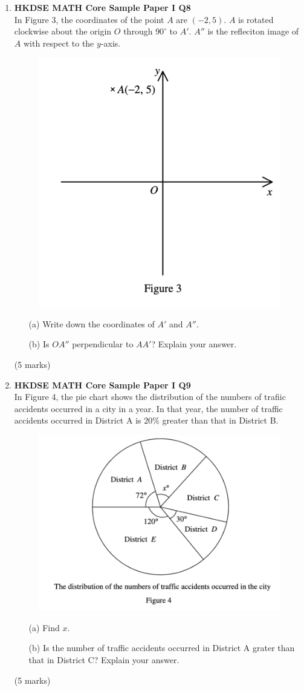 \documentclass[12pt]{article}
\begin{document}
\begin{enumerate}
	\item \textbf{HKDSE MATH Core Sample Paper I Q8}\\
	In Figure 3, the coordinates of the point $A$ are $(-2, 5)$. $A$ is rotated clockwise about the origin $O$ through $90^\circ$ to $A'$. $A''$ is the refleciton image of $A$ with respect to the $y$-axis.
	\begin{figure}[H]
		\centering
		\includegraphics[width = .5\linewidth]{SPFigure1.3}
	\end{figure}
	\begin{enumerate}
		\item[(a)] Write down the coordinates of $A'$ and $A''$.
		\item[(b)] Is $OA''$ perpendicular to $AA'$? Explain your answer. 
	\end{enumerate}
	(5 marks)

	\item \textbf{HKDSE MATH Core Sample Paper I Q9}\\
	In Figure 4, the pie chart shows the distribution of the numbers of trafiic accidents occurred in a city in a year. In that year, the number of traffic accidents occurred in District A is 20\% greater than that in District B.
	\begin{figure}[H]
		\centering
		\includegraphics[width = .5\linewidth]{SPFigure1.4}
	\end{figure}
	\begin{enumerate}
		\item[(a)] Find $x$.
		\item[(b)] Is the number of traffic accidents occurred in District A grater than that in District C? Explain your answer. 
	\end{enumerate}
	(5 marks)
	


\end{enumerate}
\end{document}

